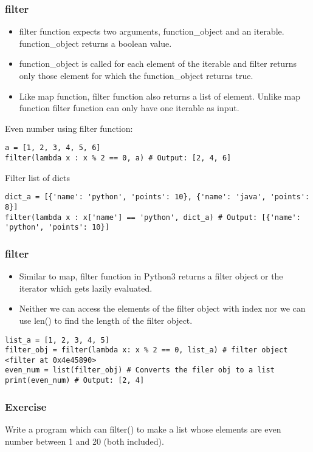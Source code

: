 \begin{frame}[fragile]\frametitle{filter}
    \begin{itemize}
    \item  filter function expects two arguments, function\_object and an iterable. function\_object returns a boolean value. 
    \item function\_object is called for each element of the iterable and filter returns only those element for which the function\_object returns true.
    \item Like map function, filter function also returns a list of element. Unlike map function filter function can only have one iterable as input.
    \end{itemize}
    Even number using filter function:
    	    \begin{lstlisting}
a = [1, 2, 3, 4, 5, 6]
filter(lambda x : x % 2 == 0, a) # Output: [2, 4, 6]
\end{lstlisting}
Filter list of dicts
    	    \begin{lstlisting}
dict_a = [{'name': 'python', 'points': 10}, {'name': 'java', 'points': 8}]
filter(lambda x : x['name'] == 'python', dict_a) # Output: [{'name': 'python', 'points': 10}]
\end{lstlisting}
\end{frame}


\begin{frame}[fragile]\frametitle{filter}
    \begin{itemize}
    \item  Similar to map, filter function in Python3 returns a filter object or the iterator which gets lazily evaluated. 
    \item Neither we can access the elements of the filter object with index nor we can use len() to find the length of the filter object.
    \end{itemize}
\begin{lstlisting}
list_a = [1, 2, 3, 4, 5]
filter_obj = filter(lambda x: x % 2 == 0, list_a) # filter object <filter at 0x4e45890>
even_num = list(filter_obj) # Converts the filer obj to a list
print(even_num) # Output: [2, 4]
\end{lstlisting}
\end{frame}

\begin{frame}[fragile]\frametitle{Exercise}
Write a program which can filter() to make a list whose elements are even number between 1 and 20 (both included).


\end{frame}

